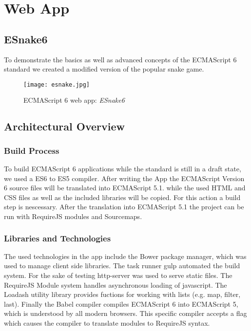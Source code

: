 \documentclass{bioinfo}
\begin{document}
\section{Web App}

\subsection{ESnake6}
To demonstrate the basics as well as advanced concepts of the ECMAScript 6 standard we created a modified version of the 
popular snake game.  

\begin{figure}[!tpb]%
\centerline{\texttt{[image: esnake.jpg]}}
\caption{ECMAScript 6 web app: \textit{ESnake6}}\label{fig:03}
\end{figure}

\subsection{Architectural Overview}
\subsubsection{Build Process}
To build ECMAScript 6 applications while the standard is still in a draft state, we used a ES6 to ES5 compiler.
After writing the App the ECMAScript Version 6 source files will be translated into ECMAScript 5.1. while the 
used HTML and CSS files as well as the included libraries will be copied. For this action a build step is nescessary. 
After the translation into ECMAScript 5.1 the project can be run with RequireJS modules and Sourcemaps.
\subsubsection{Libraries and Technologies}
The used technologies in the app include the Bower package manager, which was used to manage client side libraries. The task runner gulp automated the build system.
For the sake of testing http-server was used to serve static files. The RequireJS Module system handles asynchronous loading of javascript. The Loadash utility library
provides fuctions for working with lists (e.g. map, filter, last). Finally the Babel compiler compiles ECMAScript 6 into ECMAScript 5, which is understood by all modern browsers.
This specific compiler accepts a flag which causes the compiler to translate modules to RequireJS syntax.
\end{document}

